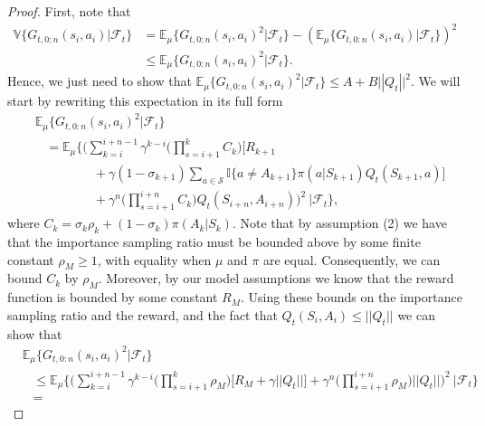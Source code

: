 \begin{proof}
First, note that
%
\begin{align*}
\mathbb{V} \{ G_{t, 0:n}(s_i, a_i) | \mathcal{F}_t \}  &= 
	\mathbb{E}_\mu \{G_{t, 0:n}(s_i, a_i)^2 | \mathcal{F}_t \}
    - (\mathbb{E}_\mu \{G_{t, 0:n}(s_i, a_i) | \mathcal{F}_t \} )^2 
    \\
& \leq 
	\mathbb{E}_\mu \{G_{t, 0:n}(s_i, a_i)^2 | \mathcal{F}_t \}.
\end{align*}
%
Hence, we just need to show that $\mathbb{E}_\mu \{G_{t, 0:n}(s_i, a_i)^2 | \mathcal{F}_t \} \leq A + B || Q_t ||^2$.
We will start by rewriting this expectation in its full form
%
\begin{align*}
& \mathbb{E}_\mu \{G_{t, 0:n}(s_i, a_i)^2 | \mathcal{F}_t \}
	\\
& \hspace{10pt} = 
	\mathbb{E}_\mu \Big\{ \Big(
    \sum^{i+n-1}_{k = i} \gamma^{k-i} \Big( \prod^k_{s=i+1} C_{k} \Big) \Big[ R_{k+1} 
    \\
& \hspace{55pt}
	+ \gamma (1 - \sigma_{k+1}) \sum_{a \in \mathcal{S}} \mathbb{I}\{ a \neq A_{k+1} \}
    \pi(a|S_{k+1}) Q_t(S_{k+1}, a) \Big]
    \\
& \hspace{55pt}
	+ \gamma^n \Big( \prod^{i+n}_{s=i+1} C_{k} \Big) Q_t( S_{i+n}, A_{i+n})
    \Big)^2 \ \big| \mathcal{F}_t \Big\}, 
\end{align*}
%
where $C_{k} = \sigma_{k} \rho_k + (1 - \sigma_{k}) \pi(A_k | S_k)$.
Note that by assumption (2) we have that the importance sampling ratio must be bounded above by some finite constant $\rho_M \geq 1$, with equality when $\mu$ and $\pi$ are equal.
Consequently, we can bound $C_{k}$ by $\rho_M$.
Moreover, by our model assumptions we know that the reward function is bounded by some constant $R_M$.
Using these bounds on the importance sampling ratio and the reward, and the fact that $Q_t(S_i, A_i) \leq || Q_t ||$ we can show that
%
\begin{align*}
& \mathbb{E}_\mu \{G_{t, 0:n}(s_i, a_i)^2 | \mathcal{F}_t \}
	\\
& \hspace{10pt} \leq
	\mathbb{E}_\mu \Big\{ \Big(
    \sum^{i+n-1}_{k=i} \gamma^{k-i} \Big( \prod^k_{s=i+1} \rho_M \Big) \Big[ R_M    
	+ \gamma || Q_t || \Big] + \gamma^n \Big( \prod^{i+n}_{s=i+1} \rho_M \Big) || Q_t ||
    \Big)^2 \ \big| \mathcal{F}_t \Big\}
	\\
& \hspace{10pt} = 

\end{align*}
\end{proof}
